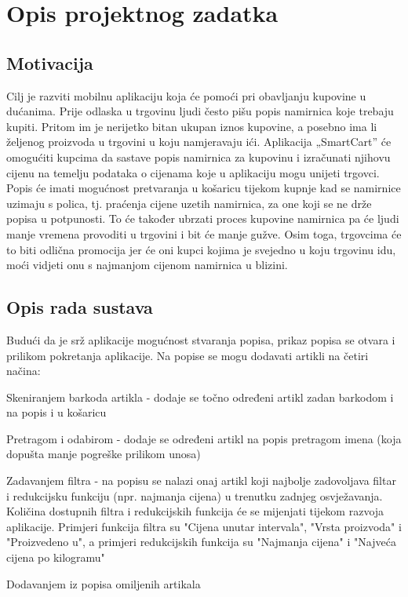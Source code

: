 \chapter{Opis projektnog zadatka}

    \section{Motivacija}
    Cilj je razviti mobilnu aplikaciju koja će pomoći pri obavljanju kupovine u
    dućanima. Prije odlaska u trgovinu ljudi često pišu popis namirnica koje trebaju
    kupiti. Pritom im je nerijetko bitan ukupan iznos kupovine, a posebno
    ima li željenog proizvoda u trgovini u koju namjeravaju ići. Aplikacija
    „SmartCart” će omogućiti kupcima da sastave
    popis namirnica za kupovinu i izračunati njihovu cijenu na temelju
    podataka o cijenama koje u aplikaciju mogu unijeti trgovci. Popis će imati
    mogućnost pretvaranja u košaricu tijekom kupnje kad se namirnice
    uzimaju s polica, tj. praćenja cijene uzetih namirnica, za one koji se
    ne drže popisa u potpunosti. To će također ubrzati proces kupovine namirnica pa će ljudi manje vremena provoditi u trgovini i bit će manje gužve. Osim toga, trgovcima će to biti odlična promocija jer će oni kupci kojima je svejedno u koju trgovinu idu, moći vidjeti onu s najmanjom cijenom namirnica u blizini. 
    
    \section{Opis rada sustava}
    Budući da je srž aplikacije mogućnost stvaranja popisa, prikaz popisa se otvara i prilikom pokretanja aplikacije. Na popise se mogu dodavati artikli na četiri načina:
    \begin{packed_item}
        \item Skeniranjem barkoda artikla - dodaje se točno određeni artikl zadan barkodom i na popis i u košaricu
        \item Pretragom i odabirom - dodaje se određeni artikl na popis pretragom imena (koja dopušta manje pogreške prilikom unosa)
        \item Zadavanjem filtra - na popisu se nalazi onaj artikl koji najbolje zadovoljava filtar i redukcijsku funkciju (npr. najmanja cijena) u trenutku zadnjeg osvježavanja. Količina dostupnih filtra i redukcijskih funkcija će se mijenjati tijekom razvoja aplikacije. Primjeri funkcija filtra su "Cijena unutar intervala", "Vrsta proizvoda" i "Proizvedeno u", a primjeri redukcijskih funkcija su "Najmanja cijena" i "Najveća cijena po kilogramu"
        \item Dodavanjem iz popisa omiljenih artikala
    \end{packed_item}
    
